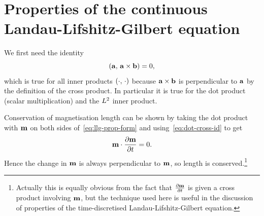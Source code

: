 
\section{Properties of the continuous Landau-Lifshitz-Gilbert equation}
\label{sec:prop-cont-llg}

We first need the identity
\begin{equation}
  \label{eq:dot-cross-id}
  \left({\mathbf{a}},\, {\mathbf{a}} \times {\mathbf{b}} \right) = 0,
\end{equation}
which is true for all inner products $\left(\cdot,\, \cdot \right)$ because ${\mathbf{a}} \times {\mathbf{b}}$ is perpendicular to ${\mathbf{a}}$ by the definition of the cross product.
In particular it is true for the dot product (scalar multiplication) and the $L^2$ inner product.

Conservation of magnetisation length can be shown by taking the dot product with $\mathbf{m}$ on both sides of~\eqref{eq:llg-prop-form} and using~\eqref{eq:dot-cross-id} to get
\begin{equation}
  \label{eq:56}
  \mathbf{m} \cdot \frac{\partial \mathbf{m}}{\partial t} = 0.
\end{equation}
Hence the change in $\mathbf{m}$ is always perpendicular to $\mathbf{m}$, so length is conserved.\footnote{Actually this is equally obvious from the fact that $\frac{\partial \mathbf{m}}{\partial t}$ is given a cross product involving $\mathbf{m}$, but the technique used here is useful in the discussion of properties of the time-discretised Landau-Lifshitz-Gilbert equation.}

